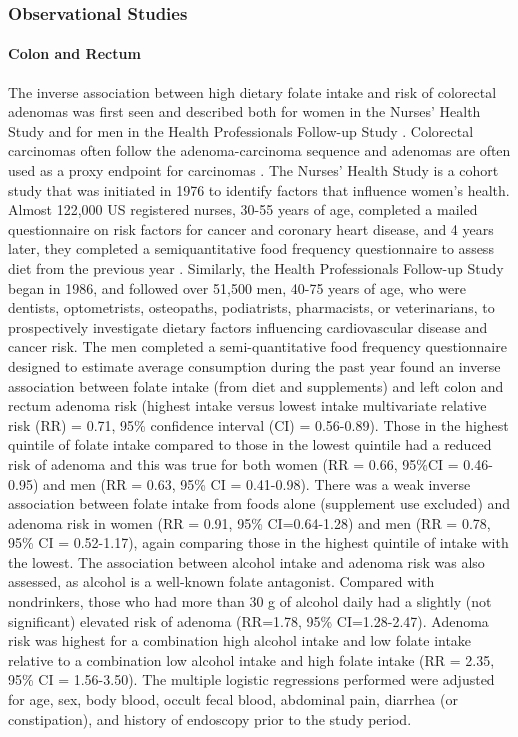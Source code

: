 \subsubsection{Observational Studies} %
\paragraph{Colon and Rectum} %
The inverse association between high dietary folate intake and risk of colorectal adenomas was first seen and described both for women in the Nurses' Health Study and for men in the Health Professionals Follow-up Study \cite{c229}. Colorectal carcinomas often follow the adenoma-carcinoma sequence and adenomas are often used as a proxy endpoint for carcinomas \cite{c230}. The Nurses' Health Study is a cohort study that was initiated in 1976 to identify factors that influence women's health. Almost 122,000 US registered nurses, 30-55 years of age, completed a mailed questionnaire on risk factors for cancer and coronary heart disease, and 4 years later, they completed a semiquantitative food frequency questionnaire to assess diet from the previous year \cite{c231}. Similarly, the Health Professionals Follow-up Study began in 1986, and followed over 51,500 men, 40-75 years of age, who were dentists, optometrists, osteopaths, podiatrists, pharmacists, or veterinarians, to prospectively investigate dietary factors 
influencing cardiovascular disease and cancer risk. The men completed a semi-quantitative food frequency questionnaire designed to estimate average consumption during the past year \cite{c229,c232} found an inverse association between folate intake (from diet and supplements) and left colon and rectum adenoma risk (highest intake versus lowest intake multivariate relative risk (RR) = 0.71, 95\% confidence interval (CI) = 0.56-0.89). Those in the highest quintile of folate intake compared to those in the lowest quintile had a reduced risk of adenoma and this was true for both women (RR = 0.66, 95\%CI = 0.46-0.95) and men (RR = 0.63, 95\% CI = 0.41-0.98). There was a weak inverse association between folate intake from foods alone (supplement use excluded) and adenoma risk in women (RR = 0.91, 95\% CI=0.64-1.28) and men (RR = 0.78, 95\% CI = 0.52-1.17), again comparing those in the highest quintile of intake with the lowest. The association between alcohol intake and adenoma risk was also assessed, as alcohol 
is a well-known folate antagonist. Compared with nondrinkers, those who had more than 30 g of alcohol daily had a slightly (not significant) elevated risk of adenoma (RR=1.78, 95\% CI=1.28-2.47). Adenoma risk was highest for a combination high alcohol intake and low folate intake relative to a combination low alcohol intake and high folate intake (RR = 2.35, 95\% CI = 1.56-3.50). The multiple logistic regressions performed were adjusted for age, sex, body blood, occult fecal blood, abdominal pain, diarrhea (or constipation), and history of endoscopy prior to the study period. 
 
